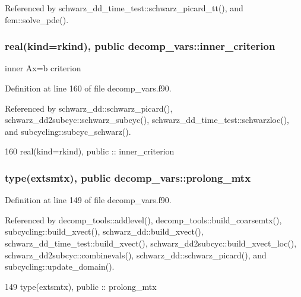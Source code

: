 Referenced by schwarz\+\_\+dd\+\_\+time\+\_\+test\+::schwarz\+\_\+picard\+\_\+tt(), and fem\+::solve\+\_\+pde().

\subsubsection[{inner\+\_\+criterion}]{\setlength{\rightskip}{0pt plus 5cm}real(kind=rkind), public decomp\+\_\+vars\+::inner\+\_\+criterion}\label{namespacedecomp__vars_afd6f18db0b5e75ec3a151b7b5f9c2e9a}


inner Ax=b criterion 



Definition at line 160 of file decomp\+\_\+vars.\+f90.



Referenced by schwarz\+\_\+dd\+::schwarz\+\_\+picard(), schwarz\+\_\+dd2subcyc\+::schwarz\+\_\+subcyc(), schwarz\+\_\+dd\+\_\+time\+\_\+test\+::schwarzloc(), and subcycling\+::subcyc\+\_\+schwarz().


\begin{DoxyCode}
160   \textcolor{keywordtype}{real(kind=rkind)}, \textcolor{keywordtype}{public} :: inner_criterion
\end{DoxyCode}
\subsubsection[{prolong\+\_\+mtx}]{\setlength{\rightskip}{0pt plus 5cm}type({\bf extsmtx}), public decomp\+\_\+vars\+::prolong\+\_\+mtx}\label{namespacedecomp__vars_a8fc2fa7837c8939c71338278f25c250e}


Definition at line 149 of file decomp\+\_\+vars.\+f90.



Referenced by decomp\+\_\+tools\+::addlevel(), decomp\+\_\+tools\+::build\+\_\+coarsemtx(), subcycling\+::build\+\_\+xvect(), schwarz\+\_\+dd\+::build\+\_\+xvect(), schwarz\+\_\+dd\+\_\+time\+\_\+test\+::build\+\_\+xvect(), schwarz\+\_\+dd2subcyc\+::build\+\_\+xvect\+\_\+loc(), schwarz\+\_\+dd2subcyc\+::combinevals(), schwarz\+\_\+dd\+::schwarz\+\_\+picard(), and subcycling\+::update\+\_\+domain().


\begin{DoxyCode}
149   \textcolor{keywordtype}{type}(extsmtx), \textcolor{keywordtype}{public} :: prolong_mtx
\end{DoxyCode}
